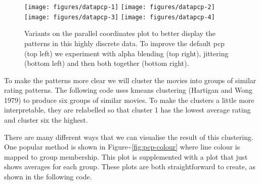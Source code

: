 \begin{figure}

{\centering \texttt{[image: figures/datapcp-1]} \texttt{[image: figures/datapcp-2]} \texttt{[image: figures/datapcp-3]} \texttt{[image: figures/datapcp-4]} 

}

\caption{Variants on the parallel coordinates plot to better display the patterns in this highly discrete data.  To improve the default pcp (top left) we experiment with alpha blending (top right), jittering (bottom left) and then both together (bottom right).\label{fig:pcp}}
\end{figure}

To make the patterns more clear we will cluster the movies into groups
of similar rating patterns. The following code uses kmeans clustering
(Hartigan and Wong 1979) to produce six groups of similar movies. To
make the clusters a little more interpretable, they are relabelled so
that cluster 1 has the lowest average rating and cluster six the
highest. 

\begin{Shaded}
\begin{Highlighting}[]
\StringTok{ }\NormalTok{(ratings[}\NormalTok{:}\NormalTok{], }\NormalTok{)}
\StringTok{ }\NormalTok{(}
\StringTok{ }\NormalTok{(}
\StringTok{ }
\end{Highlighting}
\end{Shaded}

There are many different ways that we can visualise the result of this
clustering. One popular method is shown in
Figure\textasciitilde{}\ref{fig:pcp-colour} where line colour is mapped
to group membership. This plot is supplemented with a plot that just
shows averages for each group. These plots are both straightforward to
create, as shown in the following code.

\begin{Shaded}
\begin{Highlighting}[]
\StringTok{ }
    
\StringTok{ }\NormalTok{(}  \NormalTok{/}\NormalTok{)}
\StringTok{ }\NormalTok{(}\NormalTok{(}  
   \NormalTok{)}
\end{Highlighting}
\end{Shaded}

